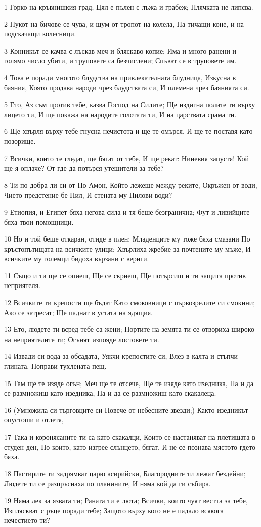\par 1 Горко на кръвнишкия град; Цял е пълен с лъжа и грабеж; Плячката не липсва.
\par 2 Пукот на бичове се чува, и шум от тропот на колела, На тичащи коне, и на подскачащи колесници.
\par 3 Конникът се качва с лъскав меч и бляскаво копие; Има и много ранени и голямо число убити, и труповете са безчислени; Спъват се в труповете им.
\par 4 Това е поради многото блудства на привлекателната блудница, Изкусна в баяния, Която продава народи чрез блудствата си, И племена чрез баянията си.
\par 5 Ето, Аз съм против тебе, казва Господ на Силите; Ще издигна полите ти върху лицето ти, И ще покажа на народите голотата ти, И на царствата срама ти.
\par 6 Ще хвърля върху тебе гнусна нечистота и ще те омърся, И ще те поставя като позорище.
\par 7 Всички, които те гледат, ще бягат от тебе, И ще рекат: Ниневия запустя! Кой ще я оплаче? От где да потърся утешители за тебе?
\par 8 Ти по-добра ли си от Но Амон, Който лежеше между реките, Окръжен от води, Чието предстение бе Нил, И стената му Нилови води?
\par 9 Етиопия, и Египет бяха негова сила и тя беше безгранична; Фут и ливийците бяха твои помощници.
\par 10 Но и той беше откаран, отиде в плен; Младенците му тоже бяха смазани По кръстопътищата на всичките улици; Хвърлиха жребие за почтените му мъже, И всичките му големци бидоха вързани с вериги.
\par 11 Също и ти ще се опиеш, Ще се скриеш, Ще потърсиш и ти защита против неприятеля.
\par 12 Всичките ти крепости ще бъдат Като смоковници с първозрелите си смокини; Ако се затресат; Ще паднат в устата на ядящия.
\par 13 Ето, людете ти всред тебе са жени; Портите на земята ти се отвориха широко на неприятелите ти; Огънят изпояде лостовете ти.
\par 14 Извади си вода за обсадата, Уякчи крепостите си, Влез в калта и стъпчи глината, Поправи тухлената пещ.
\par 15 Там ще те изяде огън; Меч ще те отсече, Ще те изяде като изедника, Па и да се размножиш като изедника, Па и да се размножиш като скакалеца.
\par 16 (Умножила си търговците си Повече от небесните звезди;) Както изедникът опустоши и отлетя,
\par 17 Така и коронясаните ти са като скакалци, Които се настаняват на плетищата в студен ден, Но които, като изгрее слънцето, бягат, И не се познава мястото гдето бяха.
\par 18 Пастирите ти задрямват царю асирийски, Благородните ти лежат бездейни; Людете ти се разпръснаха по планините, И няма кой да ги събира.
\par 19 Няма лек за язвата ти; Раната ти е люта; Всички, които чуят вестта за тебе, Изпляскват с ръце поради тебе; Защото върху кого не е падало всякога нечестието ти?

